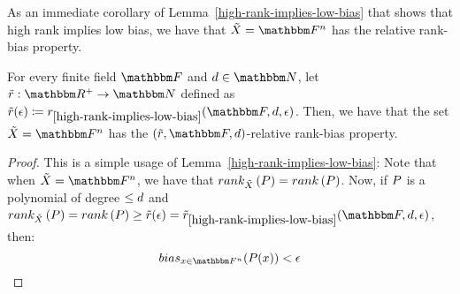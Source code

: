 As an immediate corollary of Lemma~\ref{high-rank-implies-low-bias} that shows that high rank implies low bias, we have that $\variety = \field$ has the relative rank-bias property.
\begin{corollary}
    For every finite field $\basefield$ and $\degree \in \naturalnumbersset$, let $\funcdef{\rankbiasfunc}{\realnumbersset^{+}}{\naturalnumbersset}$ defined as $\rankbiasfunc(\epsilon) \definedas \rankval_{\ref{high-rank-implies-low-bias}}(\basefield, \degree, \epsilon)$.
    Then, we have that the set $\variety = \field$ has the $(\rankbiasfunc, \basefield, \degree)$-relative rank-bias property.
\end{corollary}
\begin{proof}
    This is a simple usage of Lemma~\ref{high-rank-implies-low-bias}:
    Note that when $\variety = \field$, we have that $\relrank{\variety}{\genpoly} = \rank{\genpoly}$.
    Now, if $\genpoly$ is a polynomial of degree $\leq d$ and $\relrank{\variety}{\genpoly} = \rank{\genpoly} \geq \rankbiasfunc(\epsilon) = \rankbiasfunc_{\ref{high-rank-implies-low-bias}}(\basefield, \degree, \epsilon)$,
    then:
    \[
        \relbias{x \in \field}{\genpoly(x)} < \epsilon
    \]
\end{proof}


